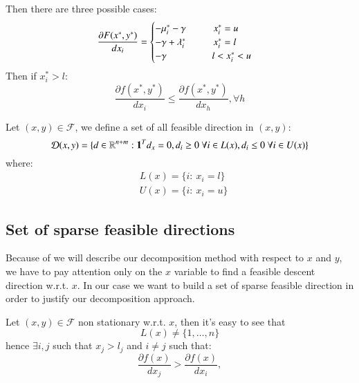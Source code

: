 Then there are three possible cases:
\begin{equation}
 \frac{\partial F(x^*,y^*)}{dx_i} = \begin{cases} -\mu_i^* -\gamma \hspace{1cm} x^*_i =u \\
 -\gamma+\lambda^*_i \hspace{1cm} x^*_i =l \\
 -\gamma \hspace{1.65cm} l<x^*_i <u 
\end{cases}
\end{equation}
Then if $x^*_i>l$: 
\begin{equation}
 \frac{\partial f(x^*,y^*)}{dx_i} \le \frac{\partial f(x^*,y^*)}{dx_h}, \forall h
\end{equation}

Let $(x,y) \in \mathcal{F}$, we define a set of all feasible direction in $(x,y)$:
\begin{equation}
 \mathcal{D}(x,y)=\{ d \in \mathbb{R}^{n+m}: \mathbf{1}^Td_x=0, d_i\ge 0 \ \forall i \in L(x), d_i\le 0 \ \forall i \in U(x)\}
\end{equation}
where:
\begin{equation}
 \begin{aligned}
  &L(x)=\{ i: \ x_i=l\}\\
  &U(x)=\{ i: \ x_i=u\}
 \end{aligned}
\end{equation}



\subsection{Set of sparse feasible directions}
Because of we will describe our decomposition method with respect to $x$ and $y$, we have to pay attention only on the $x$ variable to find a feasible descent direction w.r.t. $x$. 
In our case we want to build a set of sparse feasible direction in order to justify our decomposition approach.

Let $(x,y) \in \mathcal{F}$ non stationary w.r.t. $x$, then it's easy to see that
\begin{equation}
 L(x)\ne \{1,\ldots,n\}
\end{equation}
hence $\exists i,j$ such that $x_j>l_j$ and $i \ne j$ such that:
\begin{equation}
 \frac{\partial f(x)}{dx_j} > \frac{\partial f(x)}{dx_i}, 
\end{equation}

